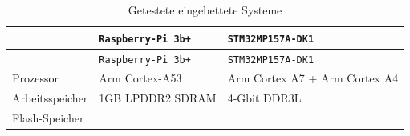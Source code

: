 \begin{longtable}[]{@{}lll@{}}
\caption{Getestete eingebettete Systeme
\label{embsystems}}\tabularnewline
\toprule
\begin{minipage}[b]{0.17\columnwidth}\raggedright
\strut
\end{minipage} & \begin{minipage}[b]{0.26\columnwidth}\raggedright
\passthrough{\lstinline!Raspberry-Pi 3b+!}\strut
\end{minipage} & \begin{minipage}[b]{0.49\columnwidth}\raggedright
\passthrough{\lstinline!STM32MP157A-DK1!}\strut
\end{minipage}\tabularnewline
\midrule
\endfirsthead
\toprule
\begin{minipage}[b]{0.17\columnwidth}\raggedright
\strut
\end{minipage} & \begin{minipage}[b]{0.26\columnwidth}\raggedright
\passthrough{\lstinline!Raspberry-Pi 3b+!}\strut
\end{minipage} & \begin{minipage}[b]{0.49\columnwidth}\raggedright
\passthrough{\lstinline!STM32MP157A-DK1!}\strut
\end{minipage}\tabularnewline
\midrule
\endhead
\begin{minipage}[t]{0.17\columnwidth}\raggedright
Prozessor\strut
\end{minipage} & \begin{minipage}[t]{0.26\columnwidth}\raggedright
Arm Cortex-A53\strut
\end{minipage} & \begin{minipage}[t]{0.49\columnwidth}\raggedright
Arm Cortex A7 + Arm Cortex A4\strut
\end{minipage}\tabularnewline
\begin{minipage}[t]{0.17\columnwidth}\raggedright
Arbeitsspeicher\strut
\end{minipage} & \begin{minipage}[t]{0.26\columnwidth}\raggedright
1GB LPDDR2 SDRAM\strut
\end{minipage} & \begin{minipage}[t]{0.49\columnwidth}\raggedright
4-Gbit DDR3L\strut
\end{minipage}\tabularnewline
\begin{minipage}[t]{0.17\columnwidth}\raggedright
Flash-Speicher\strut
\end{minipage} & \begin{minipage}[t]{0.26\columnwidth}\raggedright

\end{minipage}
\end{longtable}
